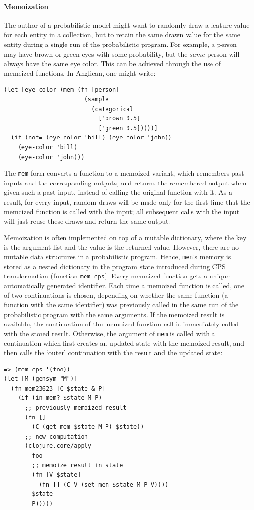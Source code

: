 \documentclass[preprint]{sigplanconf}
\begin{document}
\paragraph{Memoization}
The author of a probabilistic model might want to 
randomly draw a feature value for each entity in a collection,
but to retain the same drawn
value for the same entity during a single run of the probabilistic
program. For example, a person may have brown or green eyes
with some probability, but the \textit{same} person will
always have the same eye color. This can be achieved
through the use of memoized functions. In Anglican, one
might write:
\begin{lstlisting}[style=default]
(let [eye-color (mem (fn [person]
                       (sample
                         (categorical
                           ['brown 0.5]
                           ['green 0.5]))))]
  (if (not= (eye-color 'bill) (eye-color 'john))
    (eye-color 'bill)
    (eye-color 'john)))
\end{lstlisting}
The \texttt{mem} form converts a function to a memoized variant,
which remembers past inputs and the corresponding outputs, and 
returns the remembered output when given such a past input, 
instead of calling the original function with it. As a result,
for every input, random draws will be made only for the first time 
that the memoized function is called with the input; all subsequent
calls with the input will just reuse these draws and return the same output.

Memoization is often implemented on top of a mutable
dictionary, where the key is the argument list and the value is
the returned value. However, there are no mutable data
structures in a probabilistic program. Hence, \texttt{mem}'s
memory is stored as a nested dictionary in the program state
introduced during CPS transformation (function \texttt{mem-cps}).  
Every memoized function gets a
unique automatically generated identifier. Each time a memoized
function is called, one of two continuations is chosen,
depending on whether the same function (a function with the same
identifier) was previously called in the same run of the
probabilistic program with the same arguments. If the memoized
result is available, the continuation of the memoized function
call is immediately called with the stored result. Otherwise,
the argument of \texttt{mem} is called with a continuation which
first creates an updated state with the memoized result, and
then calls the `outer' continuation with the result and the
updated state:
\begin{lstlisting}[style=default]
=> (mem-cps '(foo))
(let [M (gensym "M")]
  (fn mem23623 [C $state & P]
    (if (in-mem? $state M P)
      ;; previously memoized result
      (fn []
        (C (get-mem $state M P) $state))
      ;; new computation
      (clojure.core/apply
        foo
        ;; memoize result in state
        (fn [V $state]
          (fn [] (C V (set-mem $state M P V))))
        $state
        P)))))
\end{lstlisting}
\end{document}

